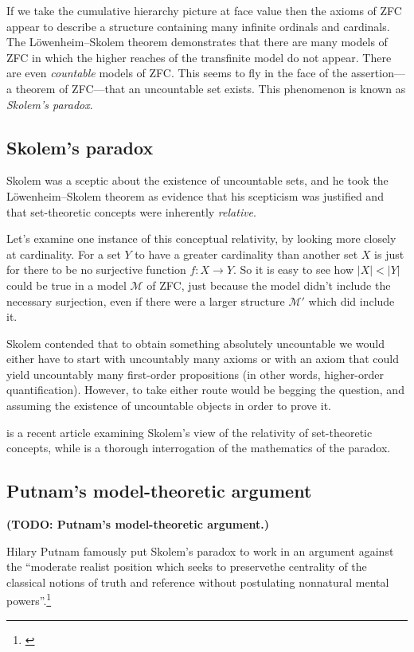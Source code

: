 \documentclass[10pt, a4paper, oneside]{article}
\theoremstyle{definition}
\theoremstyle{remark}
\theoremstyle{plain}
\theoremstyle{plain}
\begin{document}
If we take the cumulative hierarchy picture at face value then the axioms of ZFC
appear to describe a structure containing many infinite ordinals and cardinals.
The Löwenheim--Skolem theorem demonstrates that there are many models of ZFC in
which the higher reaches of the transfinite model do not appear. There are even
\emph{countable} models of ZFC. This seems to fly in the face of the
assertion---a theorem of ZFC---that an uncountable set exists. This phenomenon
is known as \emph{Skolem's paradox}.

\subsection{Skolem's paradox}

Skolem was a sceptic about the existence of uncountable sets, and he took the
Löwenheim--Skolem theorem as evidence that his scepticism was justified and
that set-theoretic concepts were inherently \emph{relative}.

Let's examine one instance of this conceptual relativity, by looking more
closely at cardinality. For a set $Y$ to have a greater cardinality than another
set $X$ is just for there to be no surjective function $f : X \rightarrow Y$. So
it is easy to see how $|X| < |Y|$ could be true in a model $\mathcal{M}$ of ZFC,
just because the model didn't include the necessary surjection, even if there
were a larger structure $\mathcal{M'}$ which did include it.

Skolem contended that to obtain something absolutely uncountable we would either
have to start with uncountably many axioms or with an axiom that could yield
uncountably many first-order propositions (in other words, higher-order
quantification). However, to take either route would be begging the question,
and assuming the existence of uncountable objects in order to prove it.

\citet{jane2001} is a recent article examining Skolem's view of the relativity
of set-theoretic concepts, while \citet{bays2007} is a thorough interrogation of
the mathematics of the paradox.

\subsection{Putnam's model-theoretic argument}

\textbf{(TODO: Putnam's model-theoretic argument.)}

Hilary Putnam famously put Skolem's paradox to work in an argument against the
``moderate realist position which seeks to preservethe centrality of the
classical notions of truth and reference without postulating nonnatural mental
powers''.\footnote{\citealt[p. 464]{putnam1980}}
\end{document}
